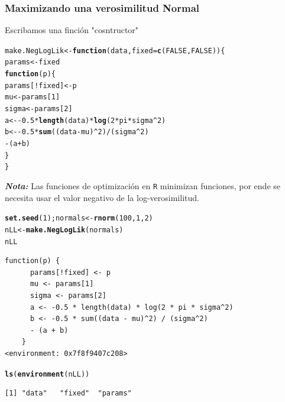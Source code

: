 \documentclass{article}\usepackage[]{graphicx}\usepackage[]{color}
\makeatletter
\newcommand{\hlnum}[1]{\textcolor[rgb]{0.686,0.059,0.569}{#1}}%
\newcommand{\hlopt}[1]{\textcolor[rgb]{0,0,0}{#1}}%
\newcommand{\hlstd}[1]{\textcolor[rgb]{0.345,0.345,0.345}{#1}}%
\newcommand{\hlkwa}[1]{\textcolor[rgb]{0.161,0.373,0.58}{\textbf{#1}}}%
\newcommand{\hlkwb}[1]{\textcolor[rgb]{0.69,0.353,0.396}{#1}}%
\newcommand{\hlkwc}[1]{\textcolor[rgb]{0.333,0.667,0.333}{#1}}%
\newcommand{\hlkwd}[1]{\textcolor[rgb]{0.737,0.353,0.396}{\textbf{#1}}}%
\newenvironment{kframe}{%
 \def\at@end@of@kframe{}%
 \ifinner\ifhmode%
  \def\at@end@of@kframe{\end{minipage}}%
  \begin{minipage}{\columnwidth}%
 \fi\fi%
 \def\FrameCommand##1{\hskip\@totalleftmargin \hskip-\fboxsep
 \colorbox{shadecolor}{##1}\hskip-\fboxsep
     \hskip-\linewidth \hskip-\@totalleftmargin \hskip\columnwidth}%
 \MakeFramed {\advance\hsize-\width
   \@totalleftmargin\z@ \linewidth\hsize
   \@setminipage}}%
 {\par\unskip\endMakeFramed%
 \at@end@of@kframe}
\newenvironment{knitrout}{}{} %
\makeatother
\begin{document}
  \subsubsection{Maximizando una verosimilitud Normal}
  Escribamos una finción "cosntructor"
\begin{knitrout}
\color{fgcolor}\begin{kframe}
\begin{alltt}
  \hlstd{make.NegLogLik} \hlkwb{<-} \hlkwa{function}\hlstd{(}\hlkwc{data}\hlstd{,} \hlkwc{fixed}\hlstd{=}\hlkwd{c}\hlstd{(}\hlnum{FALSE}\hlstd{,} \hlnum{FALSE}\hlstd{)) \{}
    \hlstd{params} \hlkwb{<-} \hlstd{fixed}
    \hlkwa{function}\hlstd{(}\hlkwc{p}\hlstd{) \{}
      \hlstd{params[}\hlopt{!}\hlstd{fixed]} \hlkwb{<-} \hlstd{p}
      \hlstd{mu} \hlkwb{<-} \hlstd{params[}\hlnum{1}\hlstd{]}
      \hlstd{sigma} \hlkwb{<-} \hlstd{params[}\hlnum{2}\hlstd{]}
      \hlstd{a} \hlkwb{<-} \hlopt{-}\hlnum{0.5} \hlopt{*} \hlkwd{length}\hlstd{(data)} \hlopt{*} \hlkwd{log}\hlstd{(}\hlnum{2} \hlopt{*} \hlstd{pi} \hlopt{*} \hlstd{sigma}\hlopt{^}\hlnum{2}\hlstd{)}
      \hlstd{b} \hlkwb{<-} \hlopt{-}\hlnum{0.5} \hlopt{*} \hlkwd{sum}\hlstd{((data} \hlopt{-} \hlstd{mu)}\hlopt{^}\hlnum{2}\hlstd{)} \hlopt{/} \hlstd{(sigma}\hlopt{^}\hlnum{2}\hlstd{)}
      \hlopt{-} \hlstd{(a} \hlopt{+} \hlstd{b)}
    \hlstd{\}}
  \hlstd{\}}
\end{alltt}
\end{kframe}
\end{knitrout}
  \textbf{\emph{Nota:}} Las funciones de optimización en \texttt{R} minimizan funciones, por ende se necesita usar el valor negativo de la log-verosimilitud.
\begin{knitrout}
\color{fgcolor}\begin{kframe}
\begin{alltt}
  \hlkwd{set.seed}\hlstd{(}\hlnum{1}\hlstd{); normals} \hlkwb{<-} \hlkwd{rnorm}\hlstd{(}\hlnum{100}\hlstd{,} \hlnum{1}\hlstd{,} \hlnum{2}\hlstd{)}
  \hlstd{nLL} \hlkwb{<-} \hlkwd{make.NegLogLik}\hlstd{(normals)}
  \hlstd{nLL}
\end{alltt}
\begin{verbatim}
function(p) {
      params[!fixed] <- p
      mu <- params[1]
      sigma <- params[2]
      a <- -0.5 * length(data) * log(2 * pi * sigma^2)
      b <- -0.5 * sum((data - mu)^2) / (sigma^2) 
      - (a + b)
    }
<environment: 0x7f8f9407c208>
\end{verbatim}
\begin{alltt}
  \hlkwd{ls}\hlstd{(}\hlkwd{environment}\hlstd{(nLL))}
\end{alltt}
\begin{verbatim}
[1] "data"   "fixed"  "params"
\end{verbatim}
\end{kframe}
\end{knitrout}
\end{document}

